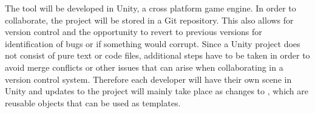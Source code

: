 The tool will be developed in Unity, a cross platform game engine. In order to collaborate, the project will be stored in a Git repository. This also allows for version control and the opportunity to revert to previous versions for identification of bugs or if something would corrupt. Since a Unity project does not consist of pure text or code files, additional steps have to be taken in order to avoid merge conflicts or other issues that can arise when collaborating in a version control system. Therefore each developer will have their own scene in Unity and updates to the project will mainly take place as changes to , which are reusable objects that can be used as templates.